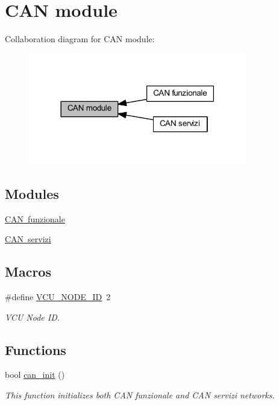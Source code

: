 \hypertarget{group___c_a_n__module__group}{}\section{C\+AN module}
\label{group___c_a_n__module__group}
Collaboration diagram for C\+AN module\+:\nopagebreak
\begin{figure}[H]
\begin{center}
\leavevmode
\includegraphics[width=270pt]{group___c_a_n__module__group}
\end{center}
\end{figure}
\subsection*{Modules}
\begin{DoxyCompactItemize}
\item 
\mbox{\hyperlink{group___c_a_n__funzionale__group}{C\+A\+N funzionale}}
\item 
\mbox{\hyperlink{group___c_a_n__servizi__group}{C\+A\+N servizi}}
\end{DoxyCompactItemize}
\subsection*{Macros}
\begin{DoxyCompactItemize}
\item 
\mbox{\label{group___c_a_n__module__group_ga5703fd8de5ab8d0dcedb561f2178829e}} 
\#define \mbox{\hyperlink{group___c_a_n__module__group_ga5703fd8de5ab8d0dcedb561f2178829e}{V\+C\+U\+\_\+\+N\+O\+D\+E\+\_\+\+ID}}~2
\begin{DoxyCompactList}\small\item\em V\+CU Node ID. \end{DoxyCompactList}\end{DoxyCompactItemize}
\subsection*{Functions}
\begin{DoxyCompactItemize}
\item 
bool \mbox{\hyperlink{group___c_a_n__module__group_ga36b6b5924eb84ef2e4c2bd548b28436f}{can\+\_\+init}} ()
\begin{DoxyCompactList}\small\item\em This function initializes both C\+AN funzionale and C\+AN servizi networks. \end{DoxyCompactList}\end{DoxyCompactItemize}


